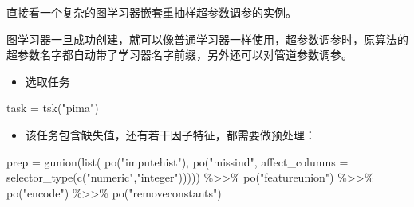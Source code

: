 \documentclass[
  11pt,
  ignorenonframetext,
  dvipsnames,UTF8]{beamer}
\newenvironment{Shaded}{\begin{snugshade}}{\end{snugshade}}
\newcommand{\AttributeTok}[1]{\textcolor[rgb]{0.77,0.63,0.00}{#1}}
\newcommand{\FunctionTok}[1]{\textcolor[rgb]{0.00,0.00,0.00}{#1}}
\newcommand{\NormalTok}[1]{#1}
\newcommand{\OtherTok}[1]{\textcolor[rgb]{0.56,0.35,0.01}{#1}}
\newcommand{\SpecialCharTok}[1]{\textcolor[rgb]{0.00,0.00,0.00}{#1}}
\newcommand{\StringTok}[1]{\textcolor[rgb]{0.31,0.60,0.02}{#1}}
\providecommand{\tightlist}{%
  \setlength{\itemsep}{0pt}\setlength{\parskip}{0pt}}
\begin{document}
\begin{frame}[fragile]{}
\protect\hypertarget{section-36}{}
直接看一个复杂的图学习器嵌套重抽样超参数调参的实例。

图学习器一旦成功创建，就可以像普通学习器一样使用，超参数调参时，原算法的超参数名字都自动带了学习器名字前缀，另外还可以对管道参数调参。

\begin{itemize}
\tightlist
\item
  选取任务
\end{itemize}

\begin{Shaded}
\begin{Highlighting}[]
\NormalTok{task }\OtherTok{=} \FunctionTok{tsk}\NormalTok{(}\StringTok{"pima"}\NormalTok{)}
\end{Highlighting}
\end{Shaded}
\end{frame}

\begin{frame}[fragile]{}
\protect\hypertarget{section-37}{}
\begin{itemize}
\tightlist
\item
  该任务包含缺失值，还有若干因子特征，都需要做预处理：
\end{itemize}

\begin{Shaded}
\begin{Highlighting}[]
\NormalTok{prep }\OtherTok{=} \FunctionTok{gunion}\NormalTok{(}\FunctionTok{list}\NormalTok{(}
    \FunctionTok{po}\NormalTok{(}\StringTok{"imputehist"}\NormalTok{), }
    \FunctionTok{po}\NormalTok{(}\StringTok{"missind"}\NormalTok{, }\AttributeTok{affect\_columns =} 
         \FunctionTok{selector\_type}\NormalTok{(}\FunctionTok{c}\NormalTok{(}\StringTok{"numeric"}\NormalTok{,}\StringTok{"integer"}\NormalTok{))))) }\SpecialCharTok{\%\textgreater{}\textgreater{}\%}
  \FunctionTok{po}\NormalTok{(}\StringTok{"featureunion"}\NormalTok{) }\SpecialCharTok{\%\textgreater{}\textgreater{}\%}
  \FunctionTok{po}\NormalTok{(}\StringTok{"encode"}\NormalTok{) }\SpecialCharTok{\%\textgreater{}\textgreater{}\%}
  \FunctionTok{po}\NormalTok{(}\StringTok{"removeconstants"}\NormalTok{)}
\end{Highlighting}
\end{Shaded}
\end{frame}
\end{document}
